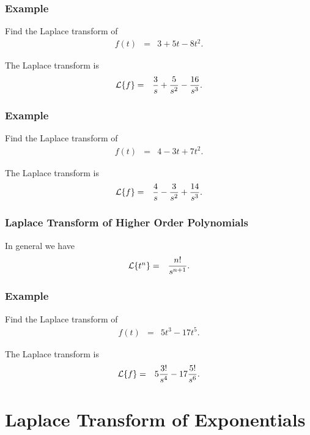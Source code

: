 \begin{frame}
  \frametitle{Example}

  Find the Laplace transform of 
  \begin{eqnarray*}
    f(t) & = & 3 + 5t - 8t^2.
  \end{eqnarray*}

  The Laplace transform is
  \begin{eqnarray*}
    \laplace{f} & = & \frac{3}{s} + \frac{5}{s^2} - \frac{16}{s^3}.
  \end{eqnarray*}

\end{frame}


\begin{frame}
  \frametitle{Example}

  Find the Laplace transform of 
  \begin{eqnarray*}
    f(t) & = & 4 - 3t + 7t^2.
  \end{eqnarray*}

  The Laplace transform is
  \begin{eqnarray*}
    \laplace{f} & = & \frac{4}{s} - \frac{3}{s^2} + \frac{14}{s^3}.
  \end{eqnarray*}

\end{frame}


\begin{frame}
  \frametitle{Laplace Transform of Higher Order Polynomials}

  In general we have
  \begin{eqnarray*}
    \laplace{t^n} & = & \frac{n!}{s^{n+1}}.
  \end{eqnarray*}

\end{frame}


\begin{frame}
  \frametitle{Example}

  Find the Laplace transform of 
  \begin{eqnarray*}
    f(t) & = & 5 t^3 - 17 t^5.
  \end{eqnarray*}

  The Laplace transform is
  \begin{eqnarray*}
    \laplace{f} & = & 5 \frac{3!}{s^4} - 17 \frac{5!}{s^6}.
  \end{eqnarray*}

\end{frame}


\section{Laplace Transform of Exponentials}

